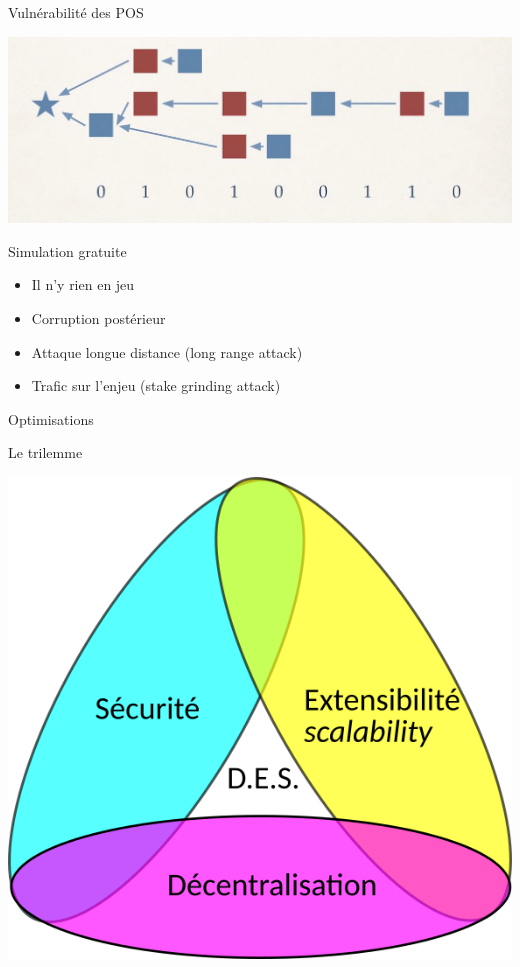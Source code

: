 \documentclass[presentation]{beamer}
\begin{document}
\begin{frame}[label={sec:org8cbcbb1}]{Vulnérabilité des POS}
\begin{center}
\includegraphics[height=.3\paperheight]{Images/longuest_chain.png}
\end{center}

\begin{block}{Simulation gratuite}
\begin{itemize}
\item Il n'y rien en jeu
\item Corruption postérieur
\item Attaque longue distance (long range attack)
\end{itemize}

\begin{itemize}
\item Trafic sur l'enjeu  (stake grinding attack)
\end{itemize}
\end{block}
\end{frame}



\begin{frame}[label={sec:org6284eb0}]{Optimisations}
\begin{block}{Le trilemme}
\begin{center}
\includegraphics[width=.7\paperheight]{Images/trilemme_ven.png}
\end{center}
\end{block}
\end{frame}
\end{document}

